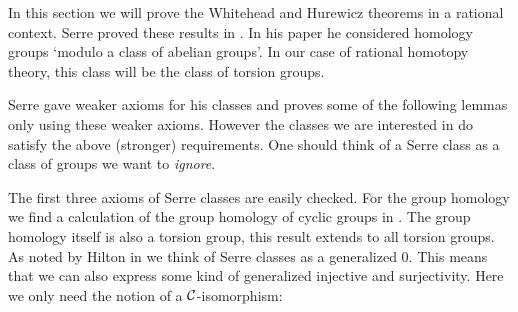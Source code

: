 

In this section we will prove the Whitehead and Hurewicz theorems in a rational context. Serre proved these results in \cite{serre}. In his paper he considered homology groups `modulo a class of abelian groups'. In our case of rational homotopy theory, this class will be the class of torsion groups.


Serre gave weaker axioms for his classes and proves some of the following lemmas only using these weaker axioms. However the classes we are interested in do satisfy the above \linebreak (stronger) requirements. One should think of a Serre class as a class of groups we want to \emph{ignore}.


The first three axioms of Serre classes are easily checked. For the group homology we find a calculation of the group homology of cyclic groups in \cite{moerdijk}. The group homology itself is also a torsion group, this result extends to all torsion groups. As noted by Hilton in \cite{hilton} we think of Serre classes as a generalized 0. This means that we can also express some kind of generalized injective and surjectivity. Here we only need the notion of a $\mathcal{C}$-isomorphism:

